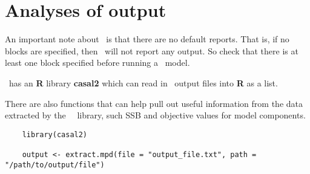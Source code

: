 \section{Analyses of output}\label{Sec:output}

An important note about \CNAME\ is that there are no default reports. That is, if no  blocks are specified, then \CNAME\ will not report any output. So check that there is at least one  block specified before running a \CNAME\ model.

\CNAME\ has an \textbf{R} library \textbf{casal2} which can read in \CNAME\ output files into \textbf{R} as a list.

There are also functions that can help pull out useful information from the data extracted by the \CNAME \ \R\ library, such SSB and objective values for model components.

{\small{\begin{verbatim}
	library(casal2)
	
	output <- extract.mpd(file = "output_file.txt", path = "/path/to/output/file")
\end{verbatim}}}
